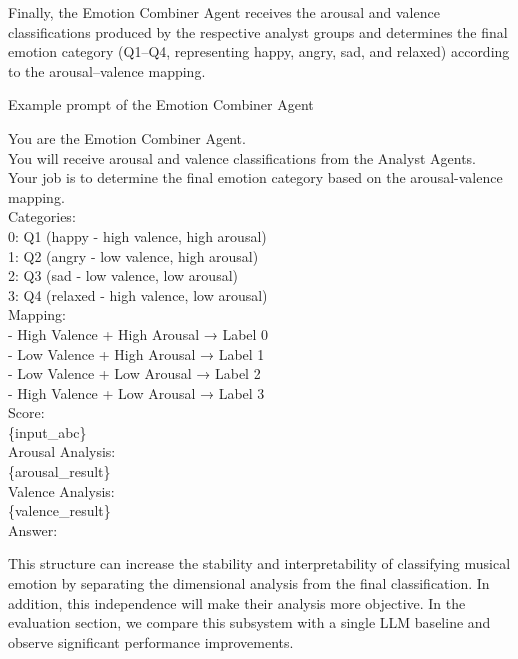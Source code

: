 \documentclass[sigconf]{acmart}
\begin{document}
Finally, the Emotion Combiner Agent receives the arousal and valence classifications produced by the respective analyst groups and determines the final emotion category (Q1–Q4, representing happy, angry, sad, and relaxed) according to the arousal–valence mapping.

\begin{promptbox}{Example prompt of the Emotion Combiner Agent}

You are the Emotion Combiner Agent.\\

You will receive arousal and valence classifications from the Analyst Agents.\\
Your job is to determine the final emotion category based on the arousal-valence mapping.\\

Categories:\\
0: Q1 (happy   - high valence, high arousal)\\
1: Q2 (angry   - low  valence, high arousal)\\
2: Q3 (sad     - low  valence, low  arousal)\\
3: Q4 (relaxed - high valence, low  arousal)\\

Mapping:\\
- High Valence + High Arousal → Label 0\\
- Low Valence + High Arousal → Label 1\\
- Low Valence + Low Arousal → Label 2\\
- High Valence + Low Arousal → Label 3\\

Score:\\
\{input\_abc\}\\

Arousal Analysis:\\
\{arousal\_result\}\\

Valence Analysis:\\
\{valence\_result\}\\

Answer:
\end{promptbox}
This structure can increase the stability and interpretability of classifying musical emotion by separating the dimensional analysis from the final classification. In addition, this independence will make their analysis more objective. In the evaluation section, we compare this subsystem with a single LLM baseline and observe significant performance improvements.
\end{document}
